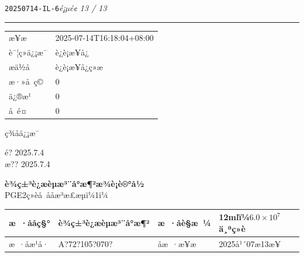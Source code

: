 \documentclass[UTF8,10pt,a4paper,fontset=fandol]{ctexart}
\newcommand{\fieldvalue}[1]{#1}
\newcommand{\handwritten}[1]{#1}
\begin{document}

\newpage

\noindent\texttt{20250714-IL-6}\hfill\textit{é¡µé¢ 13 / 13}

\noindent\rule{\textwidth}{0.4pt}

\begin{tabular}{@{}ll@{}}
æ¥æ & 
\fieldvalue{2025-07-14T16:18:04+08:00} \\[2pt]
è¯¦ç»ä¿¡æ¯ & 
\fieldvalue{è¿è¡æ¥å¿} \\[2pt]
æä½å & 
\fieldvalue{è¿è¡æ¥å¿ç»æ} \\[2pt]
æ·»å ç© & 
\fieldvalue{0} \\[2pt]
ä¿®æ¹ & 
\fieldvalue{0} \\[2pt]
å é¤ & 
\fieldvalue{0}
\end{tabular}

\medskip
ç­¾åä¿¡æ¯

\vfill

\begin{flushright}
\handwritten{é?}\quad
\handwritten{2025.7.4}\\[6pt]
\handwritten{æ??}\quad
\handwritten{2025.7.4}
\end{flushright}

\newpage

\begin{center}
\textbf{è¾ç±³è¿æèµæ³¨å°æ¶²æ¾è¡è®°å½}\\
PGE2ç»èå å­åæ³æ£æµï¼1ï¼
\end{center}

\begin{tabularx}{\textwidth}{|l|X|l|X|}
\hline
æ ·ååç§° &
\fieldvalue{è¾ç±³è¿æèµæ³¨å°æ¶²} &
æ ·åè§æ ¼ &
\fieldvalue{12mlï¼$6.0\times10^{7}$ä¸ªç»è}
\\ \hline
æ ·åæ¹å· &
\fieldvalue{\handwritten{A?72?105?070?}} &
åæ ·æ¥æ &
\fieldvalue{\handwritten{2025å¹´07æ13æ¥}}
\\ \hline
\end{tabularx}
\end{document}
